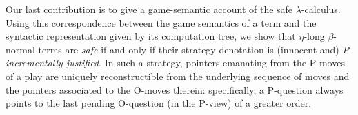 \documentclass{llncs}
\begin{document}
Our last contribution is to give a game-semantic account of the safe
$\lambda$-calculus.
%
Using this correspondence between the game semantics of a term and the
syntactic representation given by its computation tree, we show that
$\eta$-long $\beta$-normal terms are \emph{safe} if and only if their
strategy denotation is (innocent and) \emph{P-incrementally
  justified}. In such a strategy, pointers emanating from the P-moves
of a play are uniquely reconstructible from the underlying sequence of
moves and the pointers associated to the O-moves therein:
specifically, a P-question always points to the last pending
O-question (in the P-view) of a greater order.


\end{document}
